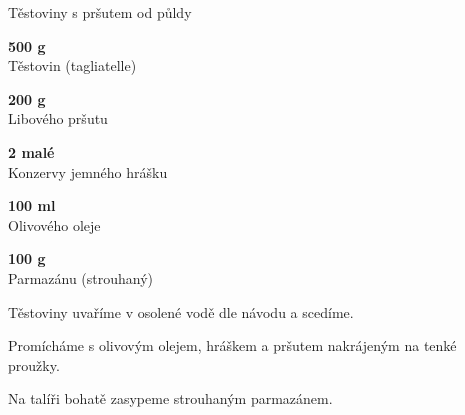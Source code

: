 \documentclass[11pt,a4paper]{article}
\begin{document}
\begin{recipe}[NavyBlue]{Těstoviny s pršutem od půldy}
    \begin{ingredients}
        \item \parbox[t]{\linewidth}{\raggedright \weight \textbf{500 g}\\ Těstovin (tagliatelle)}
        \item \parbox[t]{\linewidth}{\raggedright \weight \textbf{200 g}\\ Libového pršutu}
        \item \parbox[t]{\linewidth}{\raggedright \piece \textbf{2 malé}\\ Konzervy jemného hrášku}
        \item \parbox[t]{\linewidth}{\raggedright \liquid \textbf{100 ml}\\ Olivového oleje}
        \item \parbox[t]{\linewidth}{\raggedright \weight \textbf{100 g}\\ Parmazánu (strouhaný)}
    \end{ingredients}
    \begin{steps}
        \item Těstoviny uvaříme v osolené vodě dle návodu a scedíme.
        \item Promícháme s olivovým olejem, hráškem a pršutem nakrájeným na tenké proužky.
        \item Na talíři bohatě zasypeme strouhaným parmazánem.
    \end{steps}
\end{recipe}
\end{document}
